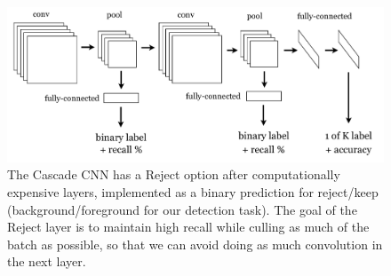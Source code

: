 \begin{figure}[h!]
\begin{center}
\includegraphics[width=0.98\columnwidth]{../ccnn/figures/ccnn-expanded.pdf}
\caption{
The Cascade CNN has a Reject option after computationally expensive layers, implemented as a binary prediction for reject/keep (background/foreground for our detection task).
The goal of the Reject layer is to maintain high recall while culling as much of the batch as possible, so that we can avoid doing as much convolution in the next layer.
}\label{fig:ccnn}
\end{center}
\end{figure}

